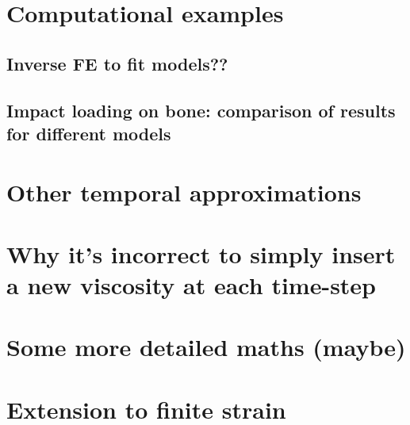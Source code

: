 \documentclass[12pt]{article}
\begin{document}
\section{Computational examples}

\subsection{Inverse FE to fit models??}

\subsection{Impact loading on bone: comparison of results for different models}


\printbibliography

\appendix

\section{Other temporal approximations}

\section{Why it's incorrect to simply insert a new viscosity at each time-step}

\section{Some more detailed maths (maybe)}

\section{Extension to finite strain}
\end{document}
